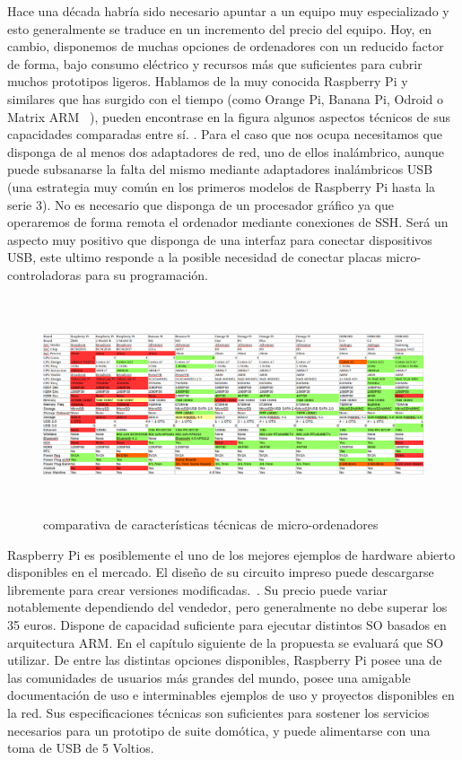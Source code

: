 Hace una década habría sido necesario apuntar a un equipo muy especializado y esto generalmente se traduce en un incremento del precio del equipo. Hoy, en cambio, disponemos de muchas opciones de ordenadores con un reducido factor de forma, bajo consumo eléctrico y recursos más que suficientes para cubrir muchos prototipos ligeros. Hablamos de la muy conocida Raspberry Pi y similares que has surgido con el tiempo (como Orange Pi, Banana Pi, Odroid o Matrix ARM ~\cite{lignuxComparative}), pueden encontrase en la figura  algunos aspectos técnicos de sus capacidades comparadas entre sí.
. Para el caso que nos ocupa necesitamos que disponga de al menos dos adaptadores de red, uno de ellos inalámbrico, aunque puede subsanarse la falta del mismo mediante adaptadores inalámbricos USB (una estrategia muy común en los primeros modelos de Raspberry Pi hasta la serie 3). No es necesario que disponga de un procesador gráfico ya que operaremos de forma remota el ordenador mediante conexiones de SSH. Será un aspecto muy positivo que disponga de una interfaz para conectar dispositivos USB, este ultimo responde a la posible necesidad de conectar placas micro-controladoras para su programación.

\begin{figure}[hbt!]
\centering
\includegraphics[height=2.5in]{figures/comparativaOrdenadores.png}
\caption[Comparativas de micro-ordenadores]{comparativa de características técnicas de micro-ordenadores\footnotemark}
\end{figure}


Raspberry Pi es posiblemente el uno de los mejores ejemplos de hardware abierto disponibles en el mercado. El diseño de su circuito impreso puede descargarse libremente para crear versiones modificadas.~\cite{raspberry_schematics}. Su precio puede variar notablemente dependiendo del vendedor, pero generalmente no debe superar los 35 euros. Dispone de capacidad suficiente para ejecutar distintos SO basados en arquitectura ARM. En el capítulo siguiente de la propuesta se evaluará que SO utilizar. De entre las distintas opciones disponibles, Raspberry Pi posee una de las comunidades de usuarios más grandes del mundo, posee una amigable documentación de uso e interminables ejemplos de uso y proyectos disponibles en la red. Sus especificaciones técnicas son suficientes para sostener los servicios necesarios para un prototipo de suite domótica, y puede alimentarse con una toma de USB de 5 Voltios.

